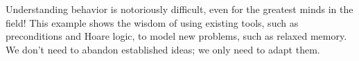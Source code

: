 Understanding \oota{} behavior is notoriously difficult, even for the
greatest minds in the field!  %
This example shows the wisdom of using existing tools, such as preconditions
and Hoare logic, to model new problems, such as relaxed memory.  We don't
need to abandon established ideas; we only need to adapt them.




